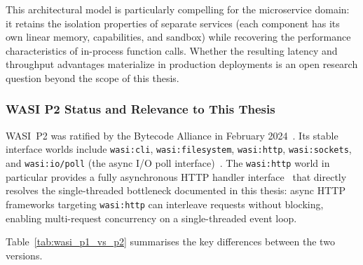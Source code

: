 This architectural model is particularly compelling for the microservice domain: it retains the isolation properties of separate services (each component has its own linear memory, capabilities, and sandbox) while recovering the performance characteristics of in-process function calls. Whether the resulting latency and throughput advantages materialize in production deployments is an open research question beyond the scope of this thesis.

\subsubsection{WASI P2 Status and Relevance to This Thesis}
\begin{sloppypar}
\acs{WASI}~P2 was ratified by the Bytecode Alliance in February 2024~\cite{clark2023preview2}. Its stable interface worlds include \texttt{wasi:cli}, \texttt{wasi:filesystem}, \texttt{wasi:http}, \texttt{wasi:sockets}, and \texttt{wasi:io/poll} (the async I/O poll interface)~\cite{clark2023preview2, bytecodealliance2024componentmodel}. The \texttt{wasi:http} world in particular provides a fully asynchronous \acs{HTTP} handler interface~\cite{clark2023preview2} that directly resolves the single-threaded bottleneck documented in this thesis: async \acs{HTTP} frameworks targeting \texttt{wasi:http} can interleave requests without blocking, enabling multi-request concurrency on a single-threaded event loop.
\end{sloppypar}

Table~\ref{tab:wasi_p1_vs_p2} summarises the key differences between the two versions.

\begin{table}[htbp]
    \centering
    \caption{Key differences between \acs{WASI}~P1 and P2}
    \label{tab:wasi_p1_vs_p2}
\end{table}

